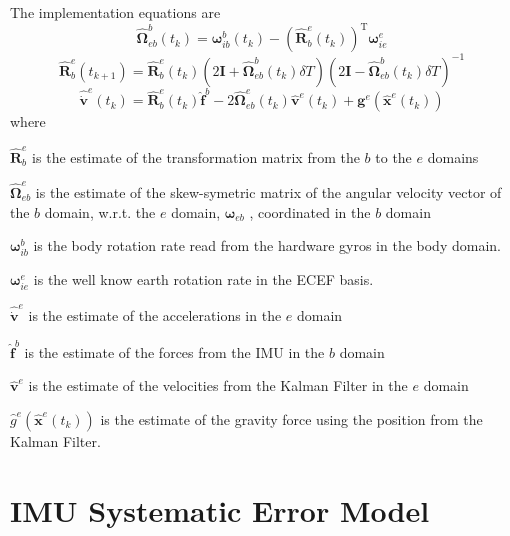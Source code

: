 \documentclass[a4paper]{report}
\numberwithin{equation}{chapter}
\newcommand{\mat}[1]{\boldsymbol{#1}}
\begin{document}
The implementation equations are
\begin{equation}
\hat{\mat{\Omega}}^b_{eb} \left( t_k \right) = \mat{\omega}^b_{ib} \left( t_k \right) - \left( \hat{\mat{R}}^e_b \left( t_k \right) \right)^{\mathrm{T}} \mat{\omega}^e_{ie}
\end{equation}
\begin{equation}
\hat{\mat{R}}^e_b \left( t_{k + 1} \right) = \hat{\mat{R}}^e_b \left( t_k \right) \left( 2\mat{I} + \hat{\mat{\Omega}}^b_{eb} \left( t_k \right) \delta{T} \right)\left( 2\mat{I} - \hat{\mat{\Omega}}^b_{eb} \left( t_k \right) \delta{T} \right)^{-1}
\end{equation}
\begin{equation}
\hat{\dot{\mat{v}}}^e \left( t_k \right) = \hat{\mat{R}}^e_b \left( t_k \right) \hat{\mat{f}}^b - 2 \hat{\mat{\Omega}}^e_{eb} \left( t_k \right) \hat{\mat{v}}^e \left( t_k \right) + \mat{g}^e \left( \hat{\mat{x}}^e \left( t_k \right) \right)
\end{equation}
where

  $\hat{\mat{R}}^e_b$ is the estimate of the transformation matrix from the $b$ to the $e$ domains

  $\hat{\mat{\Omega}}^e_{eb}$ is the estimate of the skew-symetric matrix of the angular velocity vector of the $b$ domain, w.r.t. the $e$ domain, $\mat{\omega}_{eb}$ , coordinated in the $b$ domain

  $\mat{\omega}^b_{ib}$ is the body rotation rate read from the hardware gyros in the body domain.

  $\mat{\omega}^e_{ie}$ is the well know earth rotation rate in the ECEF basis.

  $\hat{\dot{\mat{v}}}^e$ is the estimate of the accelerations in the $e$ domain

  $\hat{\mat{f}}^b$ is the estimate of the forces from the IMU in the $b$ domain

  $\hat{\mat{v}}^e$ is the estimate of the velocities from the Kalman Filter in the $e$ domain

  $\hat{g}^e \left( \hat{\mat{x}}^e \left(t_k \right) \right)$ is the estimate of the gravity force using the position from the Kalman Filter.

\section[IMU Systematic Error Model]{IMU Systematic Error Model}
\end{document}
